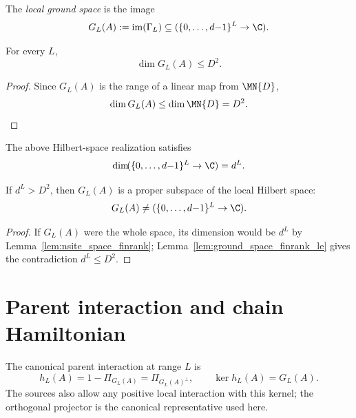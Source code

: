 \begin{definition}\label{def:ground_space_parent}
    \leanok
    The \emph{local ground space} is the image
    \[
        G_L(A) := \mathrm{im}(\Gamma_L)
        \subseteq (\{0,\ldots,d{-}1\}^L \to \C).
    \]
\end{definition}

\begin{lemma}\label{lem:ground_space_finrank_le}
    \leanok
    For every $L$,
    \[
        \dim G_L(A) \le D^2.
    \]
\end{lemma}

\begin{proof}
    \leanok
    Since $G_L(A)$ is the range of a linear map from $\MN{D}$,
    \[
        \dim G_L(A) \le \dim \MN{D} = D^2.
    \]
\end{proof}

\begin{lemma}\label{lem:nsite_space_finrank}
    \leanok
    The above Hilbert-space realization satisfies
    \[
        \dim\!(\{0,\ldots,d{-}1\}^L \to \C)=d^L.
    \]
\end{lemma}

\begin{lemma}\label{lem:ground_space_ne_top}
    \leanok
    If $d^L > D^2$, then $G_L(A)$ is a proper subspace of the local Hilbert
    space:
    \[
        G_L(A) \neq (\{0,\ldots,d{-}1\}^L \to \C).
    \]
\end{lemma}

\begin{proof}
    \leanok
    If $G_L(A)$ were the whole space, its dimension would be $d^L$ by
    Lemma~\ref{lem:nsite_space_finrank};
    Lemma~\ref{lem:ground_space_finrank_le} gives the contradiction
    $d^L \le D^2$.
\end{proof}

\section{Parent interaction and chain Hamiltonian}\label{sec:parent_interaction_defs}

The canonical parent interaction at range $L$ is
\[
    h_L(A)=1-\Pi_{G_L(A)}=\Pi_{G_L(A)^\perp},
    \qquad
    \ker h_L(A)=G_L(A).
\]
The sources also allow any positive local interaction with this kernel; the
orthogonal projector is the canonical representative used here.

